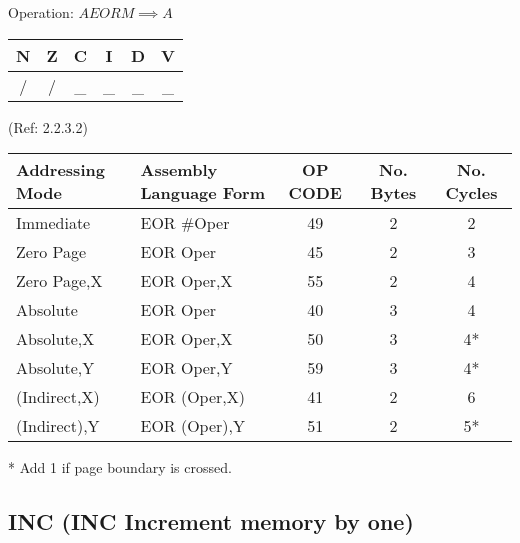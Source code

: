 \documentclass{article}
\begin{document}
  Operation:  $A EOR M \implies A$
  \begin{table}[H]
  \centering
  \begin{tabular}{|c c c c c c|}
  \hline
  N&Z&C&I&D&V\\
  \hline
  / & / & \_ & \_ & \_ & \_\\
  \hline
  \end{tabular}
  \end{table}
                               (Ref: 2.2.3.2)
  \begin{table}[H]
  \centering
  \begin{tabular}{|l|l|c|c|c|}
  \hline
   Addressing Mode& Assembly Language Form& OP CODE &No. Bytes&No. Cycles\\
  \hline
    Immediate     &   EOR \#Oper          &    49   &    2    &    2     \\
    Zero Page     &   EOR Oper            &    45   &    2    &    3     \\
    Zero Page,X   &   EOR Oper,X          &    55   &    2    &    4     \\
    Absolute      &   EOR Oper            &    40   &    3    &    4     \\
    Absolute,X    &   EOR Oper,X          &    50   &    3    &    4*    \\
    Absolute,Y    &   EOR Oper,Y          &    59   &    3    &    4*    \\
    (Indirect,X)  &   EOR (Oper,X)        &    41   &    2    &    6     \\
    (Indirect),Y  &   EOR (Oper),Y        &    51   &    2    &    5*    \\
  \hline
  \end{tabular}
  \end{table}
  * Add 1 if page boundary is crossed.

  \subsection{INC (INC Increment memory by one)}
\end{document}
